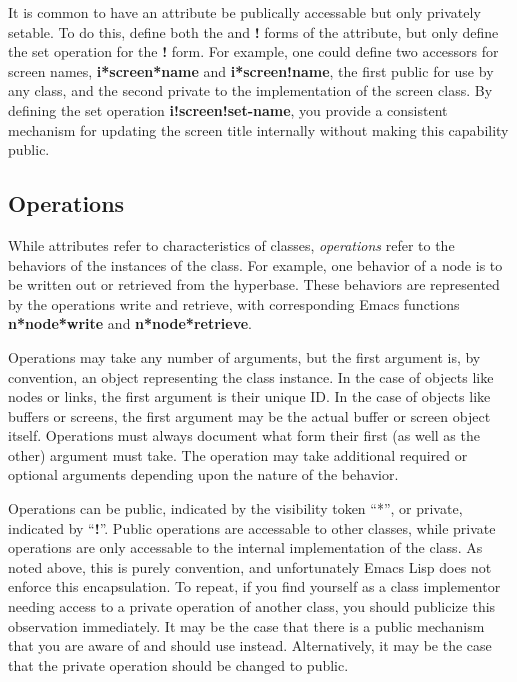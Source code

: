 It is common to have an attribute be publically accessable but only  privately
setable.  To do this, define both the {\bf *} and {\bf !}  forms of the attribute,
but only define the set operation for the {\bf !} form. For example, one could
define two accessors for screen names,  {\bf i*screen*name} and
{\bf i*screen!name}, the first public for use by any class, and the second
private to the implementation of the screen class.  By defining the set
operation {\bf i!screen!set-name}, you provide a consistent mechanism for
updating the screen title internally without making this capability public. 

\subsection{Operations}

While attributes refer to characteristics of classes, {\em operations}
refer to the behaviors of the instances of the class.  For example,
one behavior of a node is to be written out or retrieved from the
hyperbase.  These behaviors are represented by the operations
{\sf write} and {\sf retrieve}, with corresponding Emacs functions {\bf
n*node*write} and {\bf n*node*retrieve}.

Operations may take any number of arguments, but the first argument
is, by convention, an object representing the class instance.  In the
case of objects like nodes or links, the first argument is their
unique ID.  In the case of objects like buffers or screens, the first
argument may be the actual buffer or screen object itself.  Operations
must always document what form their first (as well as the other)
argument must take. The operation may take additional required or
optional arguments depending upon the nature of the behavior.


Operations can be public, indicated by the visibility token ``*'',
or private, indicated by ``{\bf !}''.  Public operations are accessable to
other classes, while private operations are only accessable to the
internal implementation of the class. As noted above, this is purely
convention, and unfortunately Emacs Lisp does not enforce this
encapsulation.  To repeat, if you find yourself as a class implementor
needing access to a private operation of another class, you should
publicize this observation immediately.  It may be the case that there
is a public mechanism that you are aware of and should use instead.
Alternatively, it may be the case that the private operation should be
changed to public.

